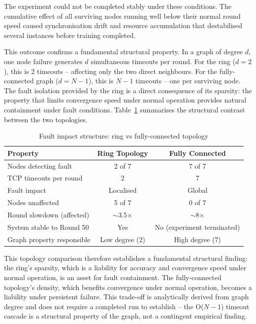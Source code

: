 \documentclass[12pt]{report}
\begin{document}
The experiment could not be completed stably under these conditions. The
cumulative effect of all surviving nodes running well below their normal round
speed caused synchronisation drift and resource accumulation that destabilised
several instances before training completed.

This outcome confirms a fundamental structural property. In a graph of degree
$d$, one node failure generates $d$ simultaneous timeouts per round. For
the ring ($d = 2$), this is 2 timeouts -- affecting only the two direct
neighbours. For the fully-connected graph ($d = N-1$), this is $N-1$
timeouts -- one per surviving node. The fault isolation provided by the ring
is a direct consequence of its sparsity: the property that limits convergence
speed under normal operation provides natural containment under fault
conditions. Table~\ref{tab:fault-topology} summarises the structural
contrast between the two topologies.

\begin{table}[H]
\centering
\begin{tabular}{lcc}
\toprule
\textbf{Property} & \textbf{Ring Topology} & \textbf{Fully Connected} \\
\midrule
Nodes detecting fault          & 2 of 7              & 7 of 7 \\
TCP timeouts per round         & 2                   & 7 \\
Fault impact                   & Localised           & Global \\
Nodes unaffected               & 5 of 7              & 0 of 7 \\
Round slowdown (affected)      & $\sim$3.5$\times$   & $\sim$8$\times$ \\
System stable to Round 50      & Yes                 & No (experiment terminated) \\
Graph property responsible     & Low degree (2)      & High degree (7) \\
\bottomrule
\end{tabular}
\vspace{0.5cm}
\caption{Fault impact structure: ring vs fully-connected topology}
\label{tab:fault-topology}
\end{table}

This topology comparison therefore establishes a fundamental structural finding:
the ring's sparsity, which is a liability for accuracy and convergence speed
under normal operation, is an asset for fault containment. The fully-connected
topology's density, which benefits convergence under normal operation, becomes
a liability under persistent failure. This trade-off is analytically derived
from graph degree and does not require a completed run to establish -- the
O($N-1$) timeout cascade is a structural property of the graph, not a
contingent empirical finding.
\end{document}
